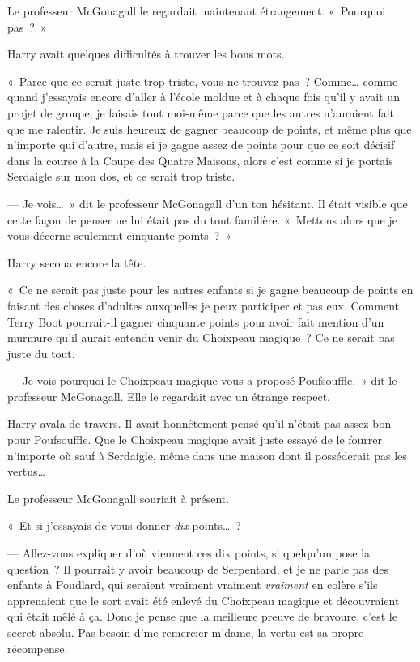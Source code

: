 Le professeur McGonagall le regardait maintenant étrangement. «~Pourquoi pas~?~»

Harry avait quelques difficultés à trouver les bons mots.

«~Parce que ce serait juste trop triste, vous ne trouvez pas~? Comme… comme quand j'essayais encore d'aller à l'école moldue et à chaque fois qu'il y avait un projet de groupe, je faisais tout moi-même parce que les autres n'auraient fait que me ralentir. Je suis heureux de gagner beaucoup de points, et même plus que n'importe qui d'autre, mais si je gagne assez de points pour que ce soit décisif dans la course à la Coupe des Quatre Maisons, alors c'est comme si je portais Serdaigle sur mon dos, et ce serait trop triste.

--- Je vois…~» dit le professeur McGonagall d'un ton hésitant. Il était visible que cette façon de penser ne lui était pas du tout familière. «~Mettons alors que je vous décerne seulement cinquante points~?~»

Harry secoua encore la tête.

«~Ce ne serait pas juste pour les autres enfants si je gagne beaucoup de points en faisant des choses d'adultes auxquelles je peux participer et pas eux. Comment Terry Boot pourrait-il gagner cinquante points pour avoir fait mention d'un murmure qu'il aurait entendu venir du Choixpeau magique~? Ce ne serait pas juste du tout.

--- Je vois pourquoi le Choixpeau magique vous a proposé Poufsouffle,~» dit le professeur McGonagall. Elle le regardait avec un étrange respect.

Harry avala de travers. Il avait honnêtement pensé qu'il n'était pas assez bon pour Poufsouffle. Que le Choixpeau magique avait juste essayé de le fourrer n'importe où sauf à Serdaigle, même dans une maison dont il posséderait pas les vertus…

Le professeur McGonagall souriait à présent.

«~Et si j'essayais de vous donner \emph{dix} points…~?

--- Allez-vous expliquer d'où viennent ces dix points, si quelqu'un pose la question~? Il pourrait y avoir beaucoup de Serpentard, et je ne parle pas des enfants à Poudlard, qui seraient vraiment vraiment \emph{vraiment} en colère s'ils apprenaient que le sort avait été enlevé du Choixpeau magique et découvraient qui était mêlé à ça. Donc je pense que la meilleure preuve de bravoure, c'est le secret absolu. Pas besoin d'me remercier m'dame, la vertu est sa propre récompense.

